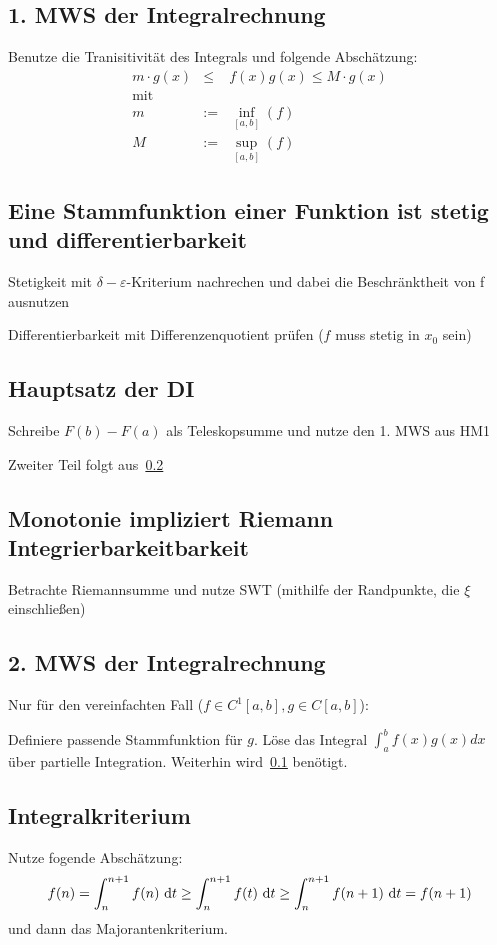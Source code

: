 \subsection{1. MWS der Integralrechnung}\label{HM2Int:1MWS}
Benutze die Tranisitivität des Integrals und folgende Abschätzung:
\begin{eqnarray*}
 m \cdot g(x) &\leq& f(x)g(x) \leq M \cdot g(x)\\
 \text{mit}\\
 m &:=&\inf\limits_{[a,b]}(f)\\
 M &:=&\sup\limits_{[a,b]}(f)
\end{eqnarray*}
\subsection{Eine Stammfunktion einer Funktion ist stetig und differentierbarkeit}\label{HM2Int:StFkt}
Stetigkeit mit $\delta-\varepsilon$-Kriterium nachrechen und dabei die Beschränktheit von
f ausnutzen

Differentierbarkeit mit Differenzenquotient prüfen ($f$ muss stetig in $x_0$ sein)

\subsection{Hauptsatz der DI}
Schreibe $F(b) - F(a)$ als Teleskopsumme und nutze den 1. MWS aus HM1

Zweiter Teil folgt aus~\ref{HM2Int:StFkt}

\subsection{Monotonie impliziert Riemann Integrierbarkeitbarkeit}
Betrachte Riemannsumme und nutze SWT (mithilfe der Randpunkte, die $\xi$ einschließen)

\subsection{2. MWS der Integralrechnung}
Nur für den vereinfachten Fall ($f \in C^1[a,b], g \in C[a,b]$):

Definiere passende Stammfunktion für $g$. Löse das Integral $\int_a^b f(x)g(x) dx$
über partielle Integration. Weiterhin wird~\ref{HM2Int:1MWS} benötigt.

\subsection{Integralkriterium}
Nutze fogende Abschätzung:
\begin{equation*}
 f(n) = \int_n^{n+1}f(n)\text{ d}t \geq \int_n^{n+1}f(t)\text{ d}t \geq \int_n^{n+1}f(n+1)\text{ d}t = f(n+1)
\end{equation*}
und dann das Majorantenkriterium.


